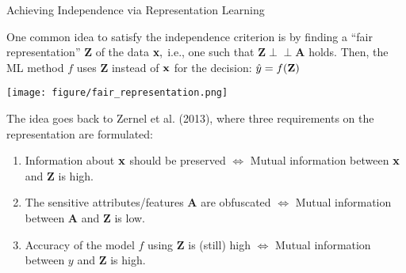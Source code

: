 \documentclass[11pt,compress,t,notes=noshow, xcolor=table]{beamer}
\newcommand{\sens}{\mathbf{A}} %
\newcommand{\indep}{\perp \!\!\! \perp} %
\begin{document}
\begin{vbframe}{Achieving Independence via Representation Learning}
	\small{
		\begin{itemize}
			\begin{minipage}{0.5\textwidth}	
%				
			\item One common idea to satisfy the independence criterion is by finding a ``fair representation'' $\mathbf{Z}$ of the data $\mathbf{x},$ i.e., one such that $ \mathbf{Z} \indep \sens$ holds.
%			
			Then, the ML method $f$ uses $\mathbf{Z}$ instead of $\mathbf{x}$ for the decision: $\hat{y} = f(\mathbf{Z})$
%			
			\end{minipage}
			\begin{minipage}{0.4\textwidth}
				\centering
				\texttt{[image: figure/fair\_representation.png]}
			\end{minipage}
			\item The idea goes back to Zernel et al. (2013), where three requirements on the representation are formulated:
%			
			\begin{enumerate}
				\small
%				
				\item Information about $\mathbf{x}$ should be preserved $\Leftrightarrow$ Mutual information between $\mathbf{x}$ and $\mathbf{Z}$ is high.
%				
				\item The sensitive attributes/features $\sens$ are obfuscated $\Leftrightarrow$ Mutual information between $\sens$ and $\mathbf{Z}$ is low.
%				
				\item Accuracy of the model $f$ using $\mathbf{Z}$ is (still) high $\Leftrightarrow$ Mutual information between $y$ and $\mathbf{Z}$ is high.
%				
			\end{enumerate}
%			
		\end{itemize}
	}
\end{vbframe}
\end{document}
